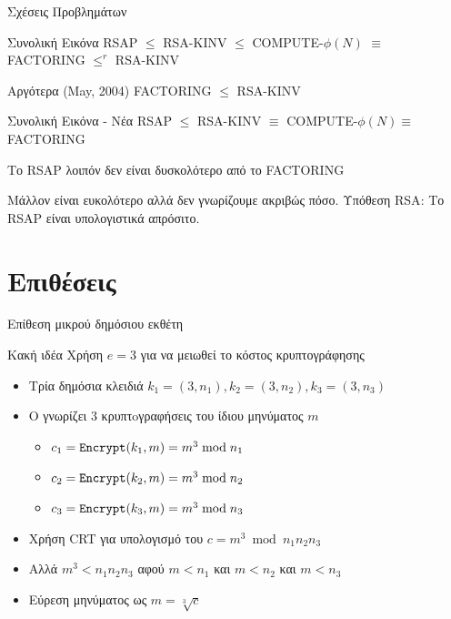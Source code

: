 \documentclass[handout]{beamer}
\begin{document}
\begin{frame}{Σχέσεις Προβλημάτων}
\begin{block}{Συνολική Εικόνα}
RSAP $\leq$ RSA-ΚINV $\leq$ COMPUTE-$\phi(N)$ $\equiv$ FACTORING $\leq^r$ RSA-KINV
\end{block}
\pause
Αργότερα (May, 2004)
FACTORING $\leq$ RSA-KINV
\pause
\begin{block}{Συνολική Εικόνα - Νέα}
RSAP $\leq$ RSA-ΚINV $\equiv$ COMPUTE-$\phi(N) \equiv$ FACTORING
\end{block}
\pause
Το RSAP λοιπόν δεν είναι δυσκολότερο από το FACTORING

Μάλλον είναι ευκολότερο αλλά δεν γνωρίζουμε ακριβώς πόσο.
\pause
\alert{Υπόθεση RSA}: Το RSAP είναι υπολογιστικά απρόσιτο.

\end{frame}

\section{Επιθέσεις}
\begin{frame}{Επίθεση μικρού δημόσιου εκθέτη}
\begin{block}{\alert{Κακή ιδέα}}
Χρήση $e=3$ για να μειωθεί το κόστος κρυπτογράφησης
\end{block}
\pause 
\begin{itemize}
\item Τρία δημόσια κλειδιά $k_1 = (3,n_1), k_2 = (3,n_2), k_3 = (3,n_3)$
\pause
\item O \adv γνωρίζει 3 κρυπτoγραφήσεις του ίδιου μηνύματος $m$
\begin{itemize}
\item $c_1 = \mathtt{Encrypt}(k_1,m) = m^3 \bmod{n_1}$
\item $c_2 = \mathtt{Encrypt}(k_2,m) = m^3 \bmod{n_2}$
\item $c_3 = \mathtt{Encrypt}(k_3,m) = m^3 \bmod{n_3}$
\end{itemize}
\pause
\item Χρήση CRT για υπολογισμό του $c = m^3 \bmod {n_1n_2n_3}$
\item Αλλά $m^3 < n_1n_2n_3$ αφού $m < n_1$ και $m < n_2$ και $ m<n_3$
\item Εύρεση μηνύματος ως $m = \sqrt[3]{c}$
\end{itemize}
\end{frame}
\end{document}
